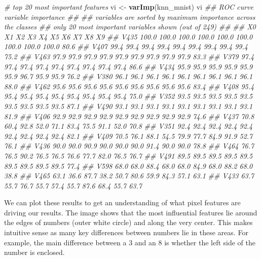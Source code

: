 \documentclass[]{krantz}
\makeatletter
\newenvironment{Shaded}{\begin{snugshade}}{\end{snugshade}}
\newcommand{\CommentTok}[1]{\textcolor[rgb]{0.37,0.37,0.37}{\textit{#1}}}
\newcommand{\KeywordTok}[1]{\textcolor[rgb]{0.27,0.27,0.27}{\textbf{#1}}}
\newcommand{\NormalTok}[1]{#1}
\newcommand{\StringTok}[1]{\textcolor[rgb]{0.5,0.5,0.5}{#1}}
\newenvironment{kframe}{%
\medskip{}
\setlength{\fboxsep}{.8em}
 \def\at@end@of@kframe{}%
 \ifinner\ifhmode%
  \def\at@end@of@kframe{\end{minipage}}%
  \begin{minipage}{\columnwidth}%
 \fi\fi%
 \def\FrameCommand##1{\hskip\@totalleftmargin \hskip-\fboxsep
 \colorbox{shadecolor}{##1}\hskip-\fboxsep
     \hskip-\linewidth \hskip-\@totalleftmargin \hskip\columnwidth}%
 \MakeFramed {\advance\hsize-\width
   \@totalleftmargin\z@ \linewidth\hsize
   \@setminipage}}%
 {\par\unskip\endMakeFramed%
 \at@end@of@kframe}
\renewenvironment{Shaded}{\begin{kframe}}{\end{kframe}}
\makeatother
\begin{document}
\begin{Shaded}
\begin{Highlighting}[]
\CommentTok{# top 20 most important features}
\NormalTok{vi <-}\StringTok{ }\KeywordTok{varImp}\NormalTok{(knn_mnist)}
\NormalTok{vi}
\CommentTok{## ROC curve variable importance}
\CommentTok{## }
\CommentTok{##   variables are sorted by maximum importance across the classes}
\CommentTok{##   only 20 most important variables shown (out of 249)}
\CommentTok{## }
\CommentTok{##         X0    X1    X2    X3    X4    X5    X6    X7    X8   X9}
\CommentTok{## V435 100.0 100.0 100.0 100.0 100.0 100.0 100.0 100.0 100.0 80.6}
\CommentTok{## V407  99.4  99.4  99.4  99.4  99.4  99.4  99.4  99.4  99.4 75.2}
\CommentTok{## V463  97.9  97.9  97.9  97.9  97.9  97.9  97.9  97.9  97.9 83.3}
\CommentTok{## V379  97.4  97.4  97.4  97.4  97.4  97.4  97.4  97.4  97.4 86.6}
\CommentTok{## V434  95.9  95.9  95.9  95.9  95.9  95.9  96.7  95.9  95.9 76.2}
\CommentTok{## V380  96.1  96.1  96.1  96.1  96.1  96.1  96.1  96.1  96.1 88.0}
\CommentTok{## V462  95.6  95.6  95.6  95.6  95.6  95.6  95.6  95.6  95.6 83.4}
\CommentTok{## V408  95.4  95.4  95.4  95.4  95.4  95.4  95.4  95.4  95.4 75.0}
\CommentTok{## V352  93.5  93.5  93.5  93.5  93.5  93.5  93.5  93.5  93.5 87.1}
\CommentTok{## V490  93.1  93.1  93.1  93.1  93.1  93.1  93.1  93.1  93.1 81.9}
\CommentTok{## V406  92.9  92.9  92.9  92.9  92.9  92.9  92.9  92.9  92.9 74.6}
\CommentTok{## V437  70.8  60.4  92.8  52.0  71.1  83.4  75.5  91.1  52.0 70.8}
\CommentTok{## V351  92.4  92.4  92.4  92.4  92.4  92.4  92.4  92.4  92.4 82.1}
\CommentTok{## V409  70.5  76.1  88.1  54.5  79.9  77.7  84.9  91.9  52.7 76.1}
\CommentTok{## V436  90.0  90.0  90.9  90.0  90.0  90.0  91.4  90.0  90.0 78.8}
\CommentTok{## V464  76.7  76.5  90.2  76.5  76.5  76.6  77.7  82.0  76.5 76.7}
\CommentTok{## V491  89.5  89.5  89.5  89.5  89.5  89.5  89.5  89.5  89.5 77.4}
\CommentTok{## V598  68.0  68.0  88.4  68.0  68.0  84.9  68.0  88.2  68.0 38.8}
\CommentTok{## V465  63.1  36.6  87.7  38.2  50.7  80.6  59.9  84.3  57.1 63.1}
\CommentTok{## V433  63.7  55.7  76.7  55.7  57.4  55.7  87.6  68.4  55.7 63.7}
\end{Highlighting}
\end{Shaded}

We can plot these results to get an understanding of what pixel features are driving our results. The image shows that the most influential features lie around the edges of numbers (outer white circle) and along the very center. This makes intuitive sense as many key differences between numbers lie in these areas. For example, the main difference between a 3 and an 8 is whether the left side of the number is enclosed.
\end{document}
